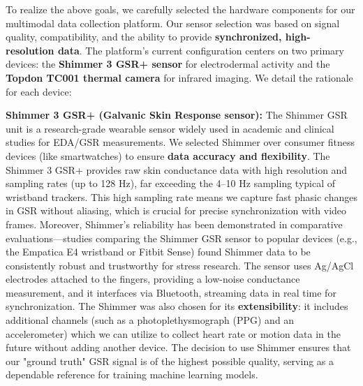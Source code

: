 \documentclass[11pt,a4paper]{report}
\begin{document}
To realize the above goals, we carefully selected the hardware components for our multimodal data collection platform. Our sensor selection was based on signal quality, compatibility, and the ability to provide \textbf{synchronized, high-resolution data}. The platform's current configuration centers on two primary devices: the \textbf{Shimmer 3 GSR+ sensor} for electrodermal activity and the \textbf{Topdon TC001 thermal camera} for infrared imaging. We detail the rationale for each device:

\textbf{Shimmer 3 GSR+ (Galvanic Skin Response sensor):} The Shimmer GSR unit is a research-grade wearable sensor widely used in academic and clinical studies for EDA/GSR measurements. We selected Shimmer over consumer fitness devices (like smartwatches) to ensure \textbf{data accuracy and flexibility}. The Shimmer 3 GSR+ provides raw skin conductance data with high resolution and sampling rates (up to 128 Hz)\cite{GSRPPGMachineLearning2024}, far exceeding the 4–10 Hz sampling typical of wristband trackers. This high sampling rate means we capture fast phasic changes in GSR without aliasing, which is crucial for precise synchronization with video frames. Moreover, Shimmer's reliability has been demonstrated in comparative evaluations—studies comparing the Shimmer GSR sensor to popular devices (e.g., the Empatica E4 wristband or Fitbit Sense) found Shimmer data to be consistently robust and trustworthy for stress research\cite{GSRPPGMachineLearning2024}. The sensor uses Ag/AgCl electrodes attached to the fingers, providing a low-noise conductance measurement, and it interfaces via Bluetooth, streaming data in real time for synchronization. The Shimmer was also chosen for its \textbf{extensibility}: it includes additional channels (such as a photoplethysmograph (PPG) and an accelerometer) which we can utilize to collect heart rate or motion data in the future without adding another device\cite{GSRPPGMachineLearning2024}. The decision to use Shimmer ensures that our "ground truth" GSR signal is of the highest possible quality, serving as a dependable reference for training machine learning models.
\end{document}
